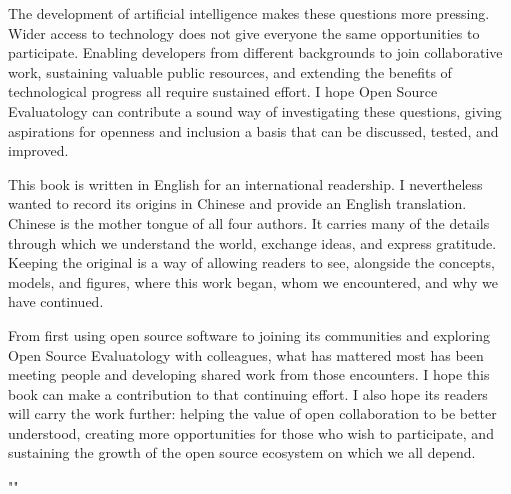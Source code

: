 The development of artificial intelligence makes these questions more pressing. Wider access to technology does not give everyone the same opportunities to participate. Enabling developers from different backgrounds to join collaborative work, sustaining valuable public resources, and extending the benefits of technological progress all require sustained effort. I hope Open Source Evaluatology can contribute a sound way of investigating these questions, giving aspirations for openness and inclusion a basis that can be discussed, tested, and improved.

This book is written in English for an international readership. I nevertheless wanted to record its origins in Chinese and provide an English translation. Chinese is the mother tongue of all four authors. It carries many of the details through which we understand the world, exchange ideas, and express gratitude. Keeping the original is a way of allowing readers to see, alongside the concepts, models, and figures, where this work began, whom we encountered, and why we have continued.

From first using open source software to joining its communities and exploring Open Source Evaluatology with colleagues, what has mattered most has been meeting people and developing shared work from those encounters. I hope this book can make a contribution to that continuing effort. I also hope its readers will carry the work further: helping the value of open collaboration to be better understood, creating more opportunities for those who wish to participate, and sustaining the growth of the open source ecosystem on which we all depend.

\par{}
\clearpage\endgroup
\XeTeXlinebreaklocale ""

